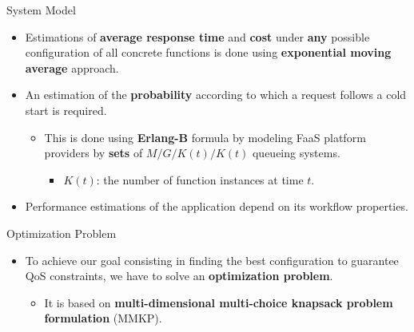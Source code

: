 \documentclass[13.5pt]{beamer}
\newcommand{\B}[1]{\textcolor{TorVergataColor}{\textbf{#1}}}
\begin{document}
\begin{frame}{System Model}

\vspace{\baselineskip}
\begin{itemize}
	\item Estimations of \B{average response time} and \B{cost} under \B{any} possible configuration of all concrete functions is done using \B{exponential moving average} approach.

	\vspace{\baselineskip}
	\item An estimation of the \B{probability} according to which a request follows a cold start is required.
	\begin{itemize}
		\vspace{\baselineskip}
		\item This is done using \B{Erlang-B} formula by modeling FaaS platform providers by \B{sets} of $M/G/K(t)/K(t)$ queueing systems.
		\begin{itemize}
			\item $K(t)$: the number of function instances at time $t$.
		\end{itemize}
	\end{itemize}

	\vspace{\baselineskip}
	\item Performance estimations of the application depend on its workflow properties.
\end{itemize}

\end{frame} 
\begin{frame}{Optimization Problem}

\begin{itemize}
	\item To achieve our goal consisting in finding the best configuration to guarantee QoS constraints, we have to solve an \B{optimization problem}.
	\begin{itemize}
		\item It is based on \B{multi-dimensional multi-choice knapsack problem formulation} (MMKP).
	\end{itemize}
\end{itemize}

\end{frame}

\end{document}
